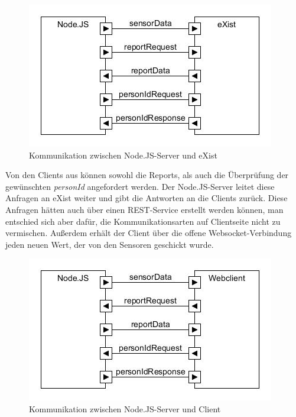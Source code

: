 \begin{figure}[h]
\begin{center}
\includegraphics[scale=0.8]{images/komm2.jpg} 
\caption{Kommunikation zwischen Node.JS-Server und eXist}
\end{center}
\end{figure}

Von den Clients aus können sowohl die Reports, als auch die Überprüfung der gewünschten \textit{personId} angefordert werden. Der Node.JS-Server leitet diese Anfragen an eXist weiter und gibt die Antworten an die Clients zurück. Diese Anfragen hätten auch über einen REST-Service erstellt werden können, man entschied sich aber dafür, die Kommunikationsarten auf Clientseite nicht zu vermischen. Außerdem erhält der Client über die offene Websocket-Verbindung jeden neuen Wert, der von den Sensoren geschickt wurde.  

\begin{figure}[h]
\begin{center}
\includegraphics[scale=0.8]{images/komm3.jpg} 
\caption{Kommunikation zwischen Node.JS-Server und Client}
\end{center}
\end{figure}